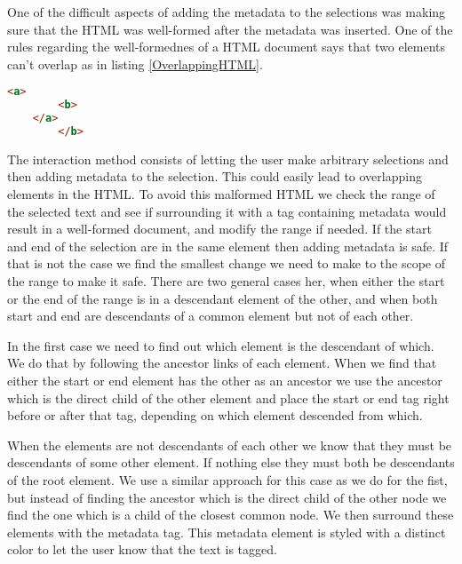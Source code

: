 One of the difficult aspects of adding the metadata to the selections was making sure that the HTML was well-formed
after the metadata was inserted.
One of the rules regarding the well-formednes of a HTML document says that two elements can't overlap as in listing \ref{OverlappingHTML}.

\begin{lstlisting}[language=HTML, caption=Example of overlapping elements, label=OverlappingHTML]
	<a>
		<b>
	</a>
		</b>
\end{lstlisting}

The interaction method consists of letting the user make arbitrary selections and then adding metadata to the selection.
This could easily lead to overlapping elements in the HTML.
To avoid this malformed HTML we check the range of the selected text and see if surrounding it with a tag
containing metadata would result in a well-formed document, and modify the range if needed.
If the start and end of the selection are in the same element then adding metadata is safe.
If that is not the case we find the smallest change we need to make to the scope of the range to make it safe.
There are two general cases her, when either the start or the end of the range is in a descendant element of the other,
and when both start and end are descendants of a common element but not of each other.

In the first case we need to find out which element is the descendant of which.
We do that by following the ancestor links of each element.
When we find that either the start or end element has the other as an ancestor we use the ancestor which is the direct
child of the other element and place the start or end tag right before or after that tag, depending on which element
descended from which.

When the elements are not descendants of each other we know that they must be descendants of some other element.
If nothing else they must both be descendants of the root element.
We use a similar approach for this case as we do for the fist,
but instead of finding the ancestor which is the direct child of the other node we find the one which is a child of the
closest common node.
We then surround these elements with the metadata tag.
This metadata element is styled with a distinct color to let the user know that the text is tagged.

